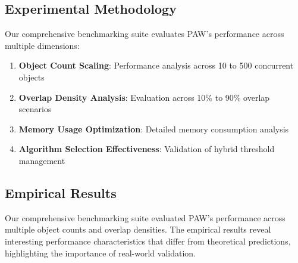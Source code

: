 \documentclass[10pt]{article}
\begin{document}
\subsection{Experimental Methodology}

Our comprehensive benchmarking suite evaluates PAW's performance across multiple dimensions:

\begin{enumerate}
    \item \textbf{Object Count Scaling}: Performance analysis across 10 to 500 concurrent objects
    \item \textbf{Overlap Density Analysis}: Evaluation across 10\% to 90\% overlap scenarios
    \item \textbf{Memory Usage Optimization}: Detailed memory consumption analysis
    \item \textbf{Algorithm Selection Effectiveness}: Validation of hybrid threshold management
\end{enumerate}

\subsection{Empirical Results}

Our comprehensive benchmarking suite evaluated PAW's performance across multiple object counts and overlap densities. The empirical results reveal interesting performance characteristics that differ from theoretical predictions, highlighting the importance of real-world validation.
\end{document}
